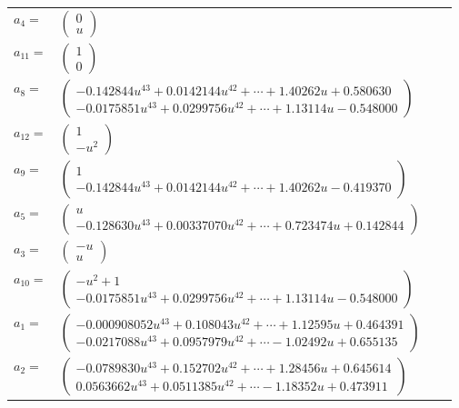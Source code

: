 \documentclass[1p]{elsarticle_modified}
\theoremstyle{definition}
\begin{document}
\begin{tabular}{m{7pt} m{180pt} m{7pt} m{180pt} }
\flushright $a_{4}=$&$\begin{pmatrix}0\\u\end{pmatrix}$ \\
\flushright $a_{11}=$&$\begin{pmatrix}1\\0\end{pmatrix}$ \\
\flushright $a_{8}=$&$\begin{pmatrix}-0.142844 u^{43}+0.0142144 u^{42}+\cdots+1.40262 u+0.580630\\-0.0175851 u^{43}+0.0299756 u^{42}+\cdots+1.13114 u-0.548000\end{pmatrix}$ \\
\flushright $a_{12}=$&$\begin{pmatrix}1\\- u^2\end{pmatrix}$ \\
\flushright $a_{9}=$&$\begin{pmatrix}1\\-0.142844 u^{43}+0.0142144 u^{42}+\cdots+1.40262 u-0.419370\end{pmatrix}$ \\
\flushright $a_{5}=$&$\begin{pmatrix}u\\-0.128630 u^{43}+0.00337070 u^{42}+\cdots+0.723474 u+0.142844\end{pmatrix}$ \\
\flushright $a_{3}=$&$\begin{pmatrix}- u\\u\end{pmatrix}$ \\
\flushright $a_{10}=$&$\begin{pmatrix}- u^2+1\\-0.0175851 u^{43}+0.0299756 u^{42}+\cdots+1.13114 u-0.548000\end{pmatrix}$ \\
\flushright $a_{1}=$&$\begin{pmatrix}-0.000908052 u^{43}+0.108043 u^{42}+\cdots+1.12595 u+0.464391\\-0.0217088 u^{43}+0.0957979 u^{42}+\cdots-1.02492 u+0.655135\end{pmatrix}$ \\
\flushright $a_{2}=$&$\begin{pmatrix}-0.0789830 u^{43}+0.152702 u^{42}+\cdots+1.28456 u+0.645614\\0.0563662 u^{43}+0.0511385 u^{42}+\cdots-1.18352 u+0.473911\end{pmatrix}$ \\

\end{tabular}
\end{document}
